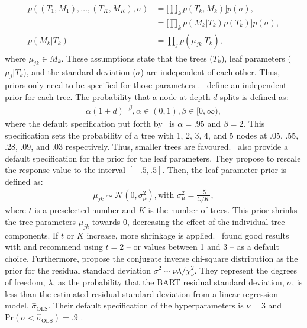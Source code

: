 \documentclass[10pt, a4paper, titlepage]{article}
\begin{document}
\begin{align}
\begin{split}
    \label{eq:independence_prior}
    p((T_1, M_1), \dots, (T_K, M_K), \sigma) &= \Big[\prod_{k}p(T_k, M_k)\Big]p(\sigma), \\
    &= \Big[\prod_{k}p(M_k|T_k)p(T_k)\Big]p(\sigma), \\
    p(M_k|T_k) &= \prod_{j}p(\mu_{jk}|T_k),
\end{split}
\end{align} where $\mu_{jk} \in M_k$. These assumptions state that the trees ($T_{k}$), leaf parameters ($\mu_{j}|T_{k}$), and the standard deviation ($\sigma$) are independent of each other. Thus, priors only need to be specified for those parameters \citep{chipman2010, hill2020, chipman2006, chipman1998}.~\citet{chipman1998} define an independent prior for each tree. The probability that a node at depth $d$ splits is defined as: 
\begin{align}
\label{eq:tree_prior}
    \alpha(1+d)^{-\beta}, \alpha \in (0,1), \beta \in [0, \infty),
\end{align} where the default specification put forth by~\citet{chipman2006,chipman2010} is $\alpha = .95$ and $\beta = 2$. This specification sets the probability of a tree with 1, 2, 3, 4, and 5 nodes at .05, .55, .28, .09, and .03 respectively. Thus, smaller trees are favoured.~\citet{chipman2006,chipman2010} also provide a default specification for the prior for the leaf parameters. They propose to rescale the response value to the interval $[-.5,.5]$. Then, the leaf parameter prior is defined as: 
\begin{align}
\label{eq:leaf_prior}
    \mu_{jk} \sim \mathcal{N}(0, \sigma^2_{\mu}), \text{with } \sigma^2_{\mu} = \frac{.5}{t\sqrt{K}},
\end{align} where $t$ is a preselected number and $K$ is the number of trees. This prior shrinks the tree parameters $\mu_{jk}$ towards 0, decreasing the effect of the individual tree components. If $t$ or $K$ increase, more shrinkage is applied.~\citet{chipman2006,chipman2010} found good results with and recommend using $t = 2$ -- or values between 1 and 3 -- as a default choice. Furthermore, \citet{chipman2006,chipman2010} propose the conjugate inverse chi-square distribution as the prior for the residual standard deviation $\sigma^2 \sim \nu\lambda/\chi^{2}_{\nu}$. They represent the degrees of freedom, $\lambda$, as the probability that the BART residual standard deviation, $\sigma$, is less than the estimated residual standard deviation from a linear regression model, $\hat{\sigma}_\text{OLS}$. Their default specification of the hyperparameters is $\nu = 3$ and $\text{Pr}(\sigma < \hat{\sigma}_\text{OLS}) = .9$ \citep{chipman2010, hill2020, chipman2006, chipman1998}.
\end{document}
